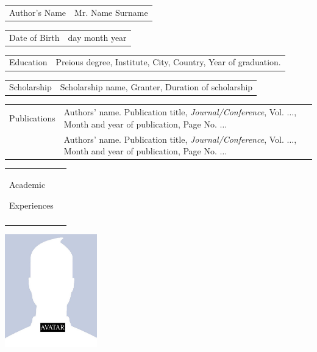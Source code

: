 \begin{cv}
\setlength{\parskip}{12pt}
\setlength{\parindent}{10mm} 
\onehalfspacing
\noindent
\begin{tabular}{@{}p{3cm}@{}p{12cm}}
    Author's Name & Mr. Name Surname \\
\end{tabular}    
\begin{spacing}{2}\end{spacing}

\noindent
\begin{tabular}{@{}p{3cm}@{}p{12cm}}
    Date of Birth & day month year \\
\end{tabular}    
\begin{spacing}{2}\end{spacing}

\noindent
\begin{tabular}{@{}p{3cm}@{}p{12cm}}
    Education &  Preious degree, Institute, City, Country, Year of graduation.
\end{tabular}    
\begin{spacing}{2}\end{spacing}

\noindent
\begin{tabular}{@{}p{3cm}@{}p{12cm}}
    Scholarship & Scholarship name, Granter, Duration of scholarship \\
\end{tabular}    
\begin{spacing}{2}\end{spacing}

\noindent
\begin{tabular}{@{}p{3cm}@{}p{12cm}}
    Publications  & Authors' name. Publication title,  {\em Journal/Conference}, Vol. $\ldots$, Month and year of publication, Page No. $\ldots$   \vspace*{0.3cm} \\
    	 		& Authors' name. Publication title,  {\em Journal/Conference}, Vol. $\ldots$, Month and year of publication, Page No. $\ldots$   \vspace*{0.3cm} \\
    		       
\end{tabular}
\begin{spacing}{2}\end{spacing}
\noindent
\begin{tabular}{@{}p{3cm}@{}p{12cm}}
Academic \par Experiences & \dotfill \\
	& \dotfill  
\end{tabular}     
\begin{spacing}{2}\end{spacing}
\noindent
\includegraphics[width=4cm]{figures/avatar.jpeg}
\end{cv}
